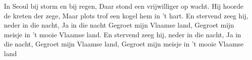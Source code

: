 \beginverse*
In Seoul bij storm en bij regen,
Daar stond een vrijwilliger op wacht.
Hij hoorde de kreten der zege,
Maar plots trof een kogel hem in ’t hart.
En stervend zeeg hij, neder in die nacht,
Ja in die nacht
\endverse
\beginverse*
Gegroet mijn Vlaamse land,
Gegroet mijn meisje in ’t mooie Vlaamse land.
En stervend zeeg hij, neder in die nacht,
Ja in die nacht,
\endverse
\beginverse*
Gegroet mijn Vlaamse land,
Gegroet mijn meisje in ’t mooie Vlaamse land
\endverse
\endsong